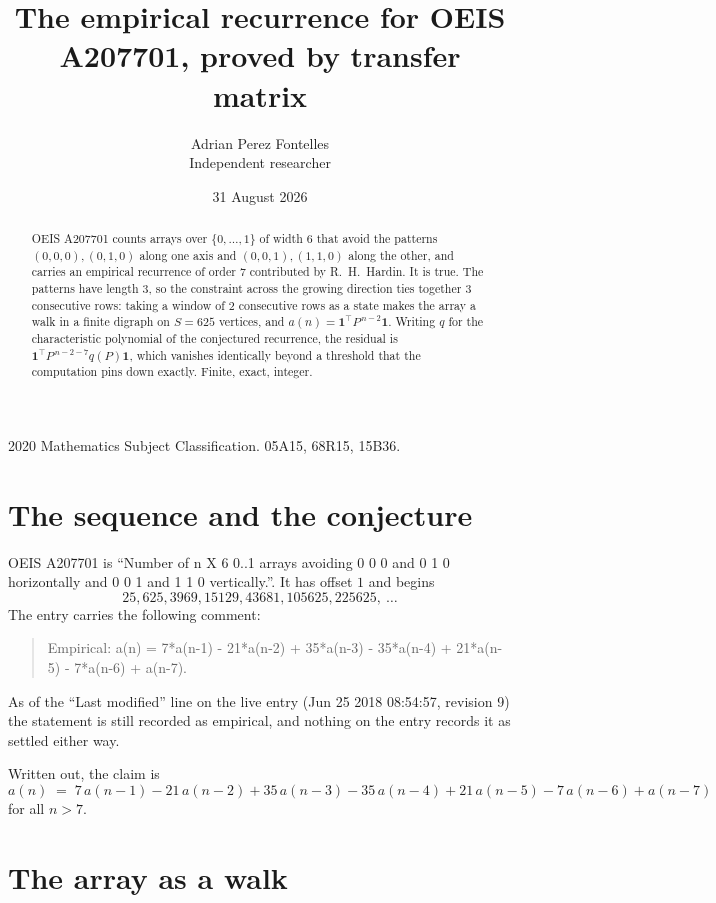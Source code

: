 \documentclass[11pt,a4paper]{article}
\title{The empirical recurrence for OEIS A207701, proved by transfer matrix}
\author{Adrian Perez Fontelles\\ \small Independent researcher}
\date{31 August 2026}
\theoremstyle{plain}
\theoremstyle{definition}
\begin{document}
\maketitle

\begin{abstract}
OEIS A207701 counts arrays over $\{0,\dots,1\}$ of width $6$ that avoid the patterns
$(0,0,0), (0,1,0)$ along one axis and $(0,0,1), (1,1,0)$ along the other, and carries an empirical recurrence of
order $7$ contributed by R.~H.~Hardin. It is true. The patterns have length $3$, so
the constraint across the growing direction ties together $3$ consecutive rows: taking a
window of $2$ consecutive rows as a state makes the array a walk in a finite digraph
on $S=625$ vertices, and $a(n)=\mathbf{1}^{\!\top}P^{\,n-2}\mathbf{1}$. Writing $q$
for the characteristic polynomial of the conjectured recurrence, the residual is
$\mathbf{1}^{\!\top}P^{\,n-2-7}q(P)\mathbf{1}$, which vanishes identically
beyond a threshold that the computation pins down exactly. Finite, exact, integer.
\end{abstract}

\noindent\small 2020 Mathematics Subject Classification. 05A15, 68R15, 15B36.\normalsize

\section{The sequence and the conjecture}

OEIS A207701 is ``Number of n X 6 0..1 arrays avoiding 0 0 0 and 0 1 0 horizontally and 0 0 1 and 1 1 0 vertically.''. It has offset
$1$ and begins
\[
25, 625, 3969, 15129, 43681, 105625, 225625,\ \dots
\]
The entry carries the following comment:
\begin{quote}\small
Empirical: a(n) = 7*a(n-1) - 21*a(n-2) + 35*a(n-3) - 35*a(n-4) + 21*a(n-5) - 7*a(n-6) + a(n-7).
\end{quote}
As of the ``Last modified'' line on the live entry (Jun 25 2018 08:54:57, revision
9) the statement is still recorded as empirical, and nothing on the entry
records it as settled either way.

Written out, the claim is
\begin{equation}\label{eq:conj}
a(n)\;=\;7\,a(n-1) - 21\,a(n-2) + 35\,a(n-3) - 35\,a(n-4) + 21\,a(n-5) - 7\,a(n-6) + a(n-7)
\end{equation}
for all $n>7$. 

\section{The array as a walk}
\end{document}
